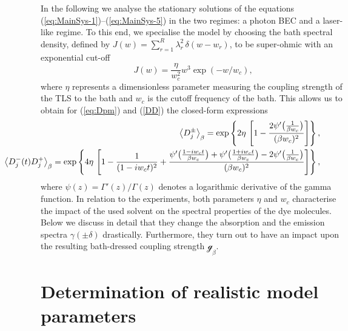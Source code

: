 \documentclass[12pt, a4paper]{iopart}
\begin{document}
In the following we analyse the stationary solutions of the equations
(\ref{eq:MainSys-1})--(\ref{eq:MainSys-5}) in the two regimes: a photon BEC and a laser-like regime. To this end, we specialise the model by choosing the bath spectral density, defined by $J(w)=\sum_{r=1}^R\lambda_r^2\,\delta(w-w_r)$, to be {super-ohmic with an exponential cut-off \cite{Weiss_book,Lee_Polaron_frames}}
%
\begin{equation}\label{eq:J(w)}
J(w)=\frac{\eta}{w_c^2}w^3\exp\left(-w/w_c\right),
\end{equation}
%
where $\eta$ represents a dimensionless parameter measuring the coupling strength of the TLS to the bath and $w_c$ is the cutoff frequency of the bath. This allows us to obtain for (\ref{eq:Dpm}) and
(\ref{DD}) the closed-form expressions
%
\numparts
\begin{eqnarray}
\hspace*{-2.55cm}
\left\langle D_j^\pm\right\rangle_\beta = \exp\left\{2\eta\,\left[1-\frac{2\psi'\big(\frac{1}{\beta w_c}\big)}{(\beta w_c)^2}\right]\right\},\label{eq:Dm-Dp-eta-a}\\
\hspace*{-2.55cm}
\left\langle D_j^-(t) D_j^+\right\rangle_\beta = \exp\left\{4\eta\,\left[1-\frac{1}{(1-i w_c t)^2}+
\frac{\psi'\big(\frac{1-i w_c t}{\beta w_c}\big)+\psi'\big(\frac{1+i w_c t}{\beta w_c}\big)-2\psi'\big(\frac{1}{\beta w_c}\big)}{(\beta w_c)^2}
\right]\right\},\label{eq:Dm-Dp-eta-b}
\end{eqnarray}
\endnumparts
%
where $\psi(z)=\Gamma'(z)/\Gamma(z)$ denotes a logarithmic derivative of the gamma function. In relation to the experiments, both parameters $\eta$ and $w_c$ characterise the impact of the used solvent on the spectral properties of the dye molecules. Below we discuss in detail that they change the absorption and the emission spectra $\gamma(\pm\delta)$ drastically. Furthermore, they turn out to have an impact upon the resulting
bath-dressed coupling strength $\mathcal{g}_\beta$.

\section{Determination of realistic model parameters}
\label{sec:parameters}
\end{document}
